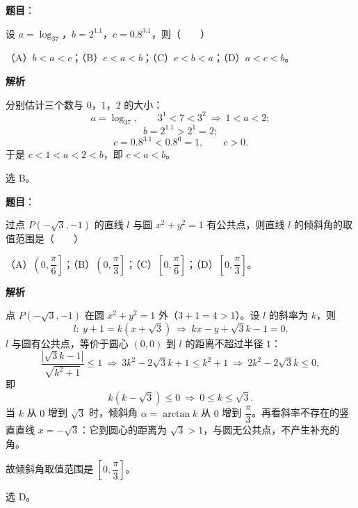 \begin{answer}

\textbf{题目}：

设 $a=\log_37$，$b=2^{1.1}$，$c=0.8^{3.1}$，则\mbox{（　　）}

（A）$b<a<c$；（B）$c<a<b$；（C）$c<b<a$；（D）$a<c<b$。

\textbf{解析}

分别估计三个数与 $0$，$1$，$2$ 的大小：
\nopagebreak[4]
\[a=\log_37,\qquad 3^1<7<3^2\ \Longrightarrow\ 1<a<2 ;\]
\nopagebreak[4]
\[b=2^{1.1}>2^1=2 ;\]
\nopagebreak[4]
\[c=0.8^{3.1}<0.8^0=1,\qquad c>0 .\]
于是 $c<1<a<2<b$，即 $c<a<b$。

选 B。


\end{answer}
\begin{answer}

\textbf{题目}：

过点 $P(-\sqrt3,-1)$ 的直线 $l$ 与圆 $x^2+y^2=1$ 有公共点，则直线 $l$ 的倾斜角的取值范围是\mbox{（　　）}

（A）$\left(0,\dfrac\pi6\right]$；（B）$\left(0,\dfrac\pi3\right]$；（C）$\left[0,\dfrac\pi6\right]$；（D）$\left[0,\dfrac\pi3\right]$。

\textbf{解析}

点 $P(-\sqrt3,-1)$ 在圆 $x^2+y^2=1$ 外（$3+1=4>1$）。设 $l$ 的斜率为 $k$，则
\nopagebreak[4]
\[l:\ y+1=k(x+\sqrt3)\ \Longrightarrow\ kx-y+\sqrt3k-1=0 .\]
$l$ 与圆有公共点，等价于圆心 $(0,0)$ 到 $l$ 的距离不超过半径 $1$：
\nopagebreak[4]
\[\frac{|\sqrt3k-1|}{\sqrt{k^2+1}}\leqslant1
\ \Longrightarrow\ 3k^2-2\sqrt3k+1\leqslant k^2+1
\ \Longrightarrow\ 2k^2-2\sqrt3k\leqslant0,\]
即
\nopagebreak[4]
\[k\left(k-\sqrt3\right)\leqslant0\ \Longrightarrow\ 0\leqslant k\leqslant\sqrt3 .\]
当 $k$ 从 $0$ 增到 $\sqrt3$ 时，倾斜角 $\alpha=\arctan k$ 从 $0$ 增到 $\dfrac\pi3$。再看斜率不存在的竖直直线 $x=-\sqrt3$：它到圆心的距离为 $\sqrt3>1$，与圆无公共点，不产生补充的角。

故倾斜角取值范围是 $\left[0,\dfrac\pi3\right]$。

选 D。


\end{answer}
